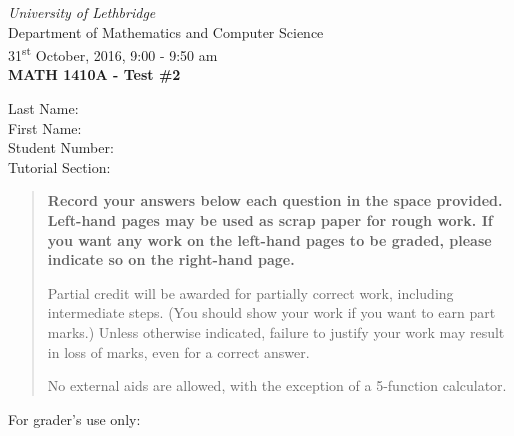 \documentclass[12pt]{article}
\newcommand{\skipline}{\vspace{12pt}}
\begin{document}
\author{Instructor: Sean Fitzpatrick}
\thispagestyle{plain}
\begin{center}
\emph{University of Lethbridge}\\
Department of Mathematics and Computer Science\\
31\textsuperscript{st} October, 2016, 9:00 - 9:50 am\\
{\bf MATH 1410A - Test \#2}\\
\end{center}
\skipline \skipline \skipline \noindent \skipline
Last Name:\underline{\hspace{50pt}{\bf Solutions}\hspace{248pt}}\\
\skipline
First Name:\underline{\hspace{50pt}{\bf The}\hspace{275pt}}\\
\skipline
Student Number:\underline{\hspace{323pt}}\\
\skipline
Tutorial Section: \underline{\hspace{320pt}}\\


\vspace{0.5in}


\begin{quote}
 {\bf Record your answers below each question in the space provided.    Left-hand pages may be used as scrap paper for rough work.  If you want any work on the left-hand pages to be graded, please indicate so on the right-hand page.
 
 \bigskip
 
Partial credit will be awarded for partially correct work, including intermediate steps. (You should show your work if you want to earn part marks.) Unless otherwise indicated, failure to justify your work may result in loss of marks, even for a correct answer. 

\bigskip

No external aids are allowed, with the exception of a 5-function calculator.}
\end{quote}


\vspace{0.5in}

For grader's use only:
\end{document}
